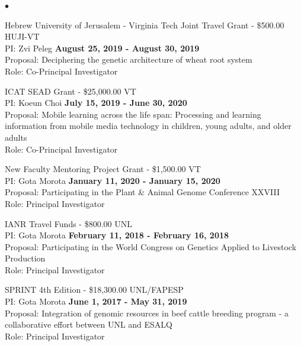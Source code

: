\documentclass[margin,line,10pt]{res}
\newenvironment{list2}{
  \begin{list}{$\bullet$}{%
      \setlength{\itemsep}{0in}
      \setlength{\parsep}{0in} \setlength{\parskip}{0in}
      \setlength{\topsep}{0in} \setlength{\partopsep}{0in} 
      \setlength{\leftmargin}{0.2in}}}{\end{list}}
\begin{document}
\begin{resume}
\begin{list2}
\vspace{0.5cm}


\item  Hebrew University of Jerusalem - Virginia Tech Joint Travel Grant - \$500.00  \hfill HUJI-VT\\
PI: Zvi Peleg  \hfill \textbf{August 25, 2019 - August 30, 2019}\\
Proposal: Deciphering the genetic architecture of wheat root system \\
Role: Co-Principal Investigator \\


\vspace{0.5cm}



\item ICAT SEAD Grant - \$25,000.00  \hfill VT\\
PI: Koeun Choi  \hfill \textbf{July 15, 2019 - June 30, 2020}\\
Proposal:  Mobile learning across the life span: Processing and learning information from mobile media technology in children, young adults, and older adults \\
Role: Co-Principal Investigator \\


\vspace{0.5cm}

\item New Faculty Mentoring Project Grant  - \$1,500.00  \hfill VT\\
PI: Gota Morota   \hfill \textbf{January 11, 2020 - January 15, 2020}\\
Proposal: Participating in the Plant \& Animal Genome Conference XXVIII\\
Role: Principal Investigator \\


\vspace{0.5cm}

\item IANR Travel Funds  - \$800.00  \hfill UNL\\
PI: Gota Morota   \hfill \textbf{February 11, 2018 - February 16, 2018}\\
Proposal: Participating in the World Congress on Genetics Applied to Livestock Production  \\
Role: Principal Investigator \\


\vspace{0.5cm}

\item SPRINT 4th Edition  - \$18,300.00  \hfill UNL/FAPESP\\
PI: Gota Morota   \hfill \textbf{June 1, 2017 - May 31, 2019}\\
Proposal: Integration of genomic resources in beef cattle breeding program - a collaborative effort between UNL and ESALQ  \\
Role: Principal Investigator \\



\end{list2}
\end{resume}
\end{document}
